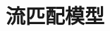 \setcounter{chapter}{26}

\hypertarget{ux6d41ux5339ux914dux6a21ux578b}{%
\chapter{流匹配模型}\label{ux6d41ux5339ux914dux6a21ux578b}}
